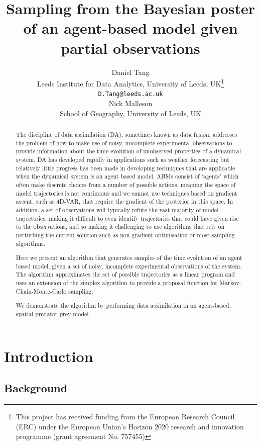 \documentclass{article}
\title{Sampling from the Bayesian poster of an agent-based model given partial observations}
\author{
  Daniel Tang\\
    Leeds Institute for Data Analytics, University of Leeds, UK\thanks{This project has received funding from the European Research Council (ERC) under the European Union’s Horizon 2020 research and innovation programme (grant agreement No. 757455)}\\
  \texttt{D.Tang@leeds.ac.uk}\\
  \AND
  Nick Malleson\\
  School of Geography, University of Leeds, UK\\  
}
\begin{document}
\maketitle

\begin{abstract}
The discipline of data assimilation (DA), sometimes known as data fusion, addresses the problem of how to make use of noisy, imcomplete experimental observations to provide information about the time evolution of unobserved properties of a dynamical system. DA has developed rapidly in applications such as weather forecasting but relatively little progress has been made in developing techniques that are applicable when the dynamical system is an agent based model. ABMs consist of `agents' which often make discrete choices from a number of possible actions, meaning the space of model trajectories is not continuous and we cannot use techniques based on gradient ascent, such as 4D-VAR, that require the gradient of the posterior in this space. In addition, a set of observations will typically refute the vast majority of model trajectories, making it difficult to even identify trajectories that could have given rise to the observations, and so making it challenging to use algorithms that rely on perturbing the current solution such as non-gradient optimisation or most sampling algorithms.

Here we present an algorithm that generates samples of the time evolution of an agent based model, given a set of noisy, incomplete experimental observations of the system. The algorithm approximates the set of possible trajectories as a linear program and uses an extension of the simplex algorithm to provide a proposal function for Markov-Chain-Monte-Carlo sampling.

We demonstrate the algorithm by performing data assimilation in an agent-based, spatial predator-prey model.
\end{abstract}


\section{Introduction}

\subsection{Background}\label{sec:background}
\end{document}

